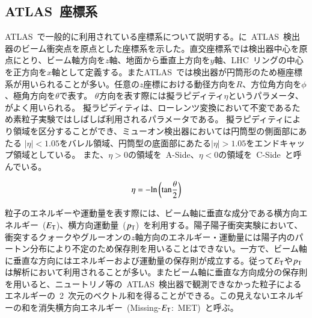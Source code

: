 \subsection{ATLAS~座標系}
ATLAS~で一般的に利用されている座標系について説明する。に~ATLAS~検出器のビーム衝突点を原点とした座標系を示した。直交座標系では検出器中心を原点にとり、ビーム軸方向を$z$軸、地面から垂直上方向を$y$軸、LHC~リングの中心を正方向を$x$軸として定義する。またATLAS~では検出器が円筒形のため極座標系が用いられることが多い。任意の$z$座標における動径方向を$R$、方位角方向を$\phi$、極角方向を$\theta$で表す。
$\theta$方向を表す際には擬ラピディティ$\eta$というパラメータ、がよく用いられる。
擬ラピディティは、ローレンツ変換において不変であるため素粒子実験ではしばしば利用されるパラメータである。
擬ラピディティにより領域を区分することができ、ミューオン検出器においては円筒型の側面部にあたる
$|\eta| < 1.05$をバレル領域、円筒型の底面部にあたる$|\eta| > 1.05$をエンドキャップ領域としている。
また、$\eta>0$の領域を~A-Side、$\eta<0$の領域を~C-Side~と呼んでいる。

\begin{align}
    \eta = -\rm{ln}\left(\rm{tan}\frac{\theta}{2}\right) \label{eq:eta}
\end{align}

粒子のエネルギーや運動量を表す際には、ビーム軸に垂直な成分である横方向エネルギー~($E_{\rm{T}}$)、横方向運動量~($p_{\rm{T}}$)~を利用する。陽子陽子衝突実験において、衝突するクォークやグルーオンの$z$軸方向のエネルギー・運動量には陽子内のパートン分布により不定のため保存則を用いることはできない。一方で、ビーム軸に垂直な方向にはエネルギーおよび運動量の保存則が成立する。従って$E_{\rm{T}}$や$p_{\rm{T}}$は解析において利用されることが多い。またビーム軸に垂直な方向成分の保存則を用いると、ニュートリノ等の~ATLAS~検出器で観測できなかった粒子によるエネルギーの~2~次元のベクトル和を得ることができる。この見えないエネルギーの和を消失横方向エネルギー~(Missing-$E_{\rm{T}}$:~MET)~と呼ぶ。

